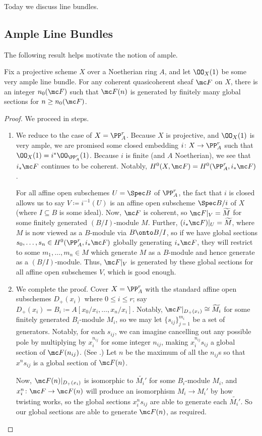 \documentclass[../notes.tex]{subfiles}
\begin{document}
Today we discuss line bundles.

\subsection{Ample Line Bundles}
The following result helps motivate the notion of ample.
\begin{proposition}[Serre] \label{prop:very-ample-is-ample}
	Fix a projective scheme $X$ over a Noetherian ring $A$, and let $\OO_X(1)$ be some very ample line bundle. For any coherent quasicoherent sheaf $\mc F$ on $X$, there is an integer $n_0(\mc F)$ such that $\mc F(n)$ is generated by finitely many global sections for $n\ge n_0(\mc F)$.
\end{proposition}
\begin{proof}
	We proceed in steps.
	\begin{enumerate}
		\item We reduce to the case of $X=\PP^r_A$. Because $X$ is projective, and $\OO_X(1)$ is very ample, we are promised some closed embedding $i\colon X\to\PP^r_A$ such that $\OO_X(1)=i^*\OO_{\PP^r_A}(1)$. Because $i$ is finite (and $A$ Noetherian), we see that $i_*\mc F$ continues to be coherent. Notably, $H^0(X,\mc F)=H^0(\PP^r_A,i_*\mc F)$.

		For all affine open subschemes $U=\Spec B$ of $\PP^r_A$, the fact that $i$ is closed allows us to say $V\coloneqq i^{-1}(U)$ is an affine open subscheme $\Spec B/i$ of $X$ (where $I\subseteq B$ is some ideal). Now, $\mc F$ is coherent, so $\mc F|_V=\widetilde M$ for some finitely generated $(B/I)$-module $M$. Further, $(i_*\mc F)|_U=\widetilde M$, where $M$ is now viewed as a $B$-module via $B\onto B/I$, so if we have global sections $s_0,\ldots,s_n\in H^0(\PP^r_A,i_*\mc F)$ globally generating $i_*\mc F$, they will restrict to some $m_1,\ldots,m_n\in M$ which generate $M$ as a $B$-module and hence generate as a $(B/I)$-module. Thus, $\mc F|_V$ is generated by these global sections for all affine open subschemes $V$, which is good enough.

		\item We complete the proof. Cover $X=\PP^r_A$ with the standard affine open subschemes $D_+(x_i)$ where $0\le i\le r$; say $D_+(x_i)=B_i\coloneqq A[x_0/x_i,\ldots,x_n/x_i]$. Notably, $\mc F|_{D_+(x_i)}\cong\widetilde{M_i}$ for some finitely generated $B_i$-module $M_i$, so we may let $\{s_{ij}\}_{j=1}^{m_i}$ be a set of generators. Notably, for each $s_{ij}$, we can imagine cancelling out any possible pole by multiplying by $x_i^{n_{ij}}$ for some integer $n_{ij}$, making $x_i^{n_{ij}}s_{ij}$ a global section of $\mc F(n_{ij})$. (See \cite[Exercise~II.5.14]{hartshorne}.) Let $n$ be the maximum of all the $n_{ij}$s so that $x^ns_{ij}$ is a global section of $\mc F(n)$.

		Now, $\mc F(n)|_{D_+(x_i)}$ is isomorphic to $\widetilde{M_i'}$ for some $B_i$-module $M_i$, and $x_i^n\colon\mc F\to\mc F(n)$ will produce an isomorphism $M_i\to M_i'$ by how twisting works, so the global sections $x_i^ns_{ij}$ are able to generate each $\widetilde{M_i'}$. So our global sections are able to generate $\mc F(n)$, as required.
		\qedhere
	\end{enumerate}
\end{proof}
\end{document}
